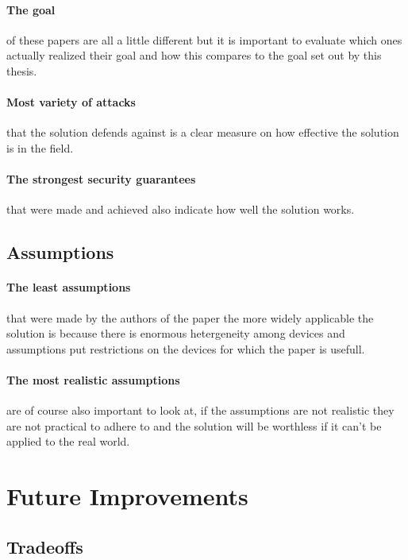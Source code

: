 \documentclass{report}
\begin{document}
\paragraph*{The goal}
of these papers are all a little different but it is important to evaluate which ones actually realized their goal and how this compares to the goal set out by this thesis.

\paragraph*{Most variety of attacks}
that the solution defends against is a clear measure on how effective the solution is in the field.

\paragraph*{The strongest security guarantees}
that were made and achieved also indicate how well the solution works.

\subsection*{Assumptions}

\paragraph*{The least assumptions}
that were made by the authors of the paper the more widely applicable the solution is because there is enormous hetergeneity among devices and assumptions put restrictions on the devices for which the paper is usefull.

\paragraph*{The most realistic assumptions}
are of course also important to look at, if the assumptions are not realistic they are not practical to adhere to and the solution will be worthless if it can't be applied to the real world.

\section{Future Improvements}

\subsection*{Tradeoffs}
\end{document}
